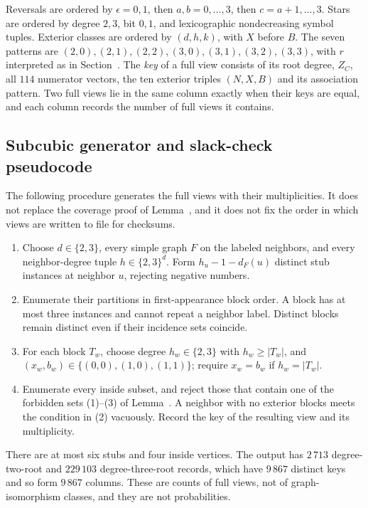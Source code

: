 \documentclass[11pt]{article}
\begin{document}
Reversals are ordered by $\epsilon=0,1$, then $a,b=0,\ldots,3$, then $c=a+1,\ldots,3$. Stars are ordered by degree $2,3$, bit $0,1$, and lexicographic nondecreasing symbol tuples. Exterior classes are ordered by $(d,h,k)$, with $X$ before $B$. The seven patterns are $(2,0),(2,1),(2,2),(3,0),(3,1),(3,2),(3,3)$, with $r$ interpreted as in Section~. The \emph{key} of a full view consists of its root degree, $Z_C$, all $114$ numerator vectors, the ten exterior triples $(N,X,B)$ and its association pattern. Two full views lie in the same column exactly when their keys are equal, and each column records the number of full views it contains.

\subsection{Subcubic generator and slack-check pseudocode}
The following procedure generates the full views with their multiplicities. It does not replace the coverage proof of Lemma~, and it does not fix the order in which views are written to file for checksums.
\begin{enumerate}[itemsep=3pt]
\item Choose $d\in\{2,3\}$, every simple graph $F$ on the labeled neighbors, and every neighbor-degree tuple $h\in\{2,3\}^d$. Form $h_u-1-d_F(u)$ distinct stub instances at neighbor $u$, rejecting negative numbers.
\item Enumerate their partitions in first-appearance block order. A block has at most three instances and cannot repeat a neighbor label. Distinct blocks remain distinct even if their incidence sets coincide.
\item For each block $T_w$, choose degree $h_w\in\{2,3\}$ with $h_w\ge|T_w|$, and $(x_w,b_w)\in\{(0,0),(1,0),(1,1)\}$; require $x_w=b_w$ if $h_w=|T_w|$.
\item Enumerate every inside subset, and reject those that contain one of the forbidden sets (1)--(3) of Lemma~. A neighbor with no exterior blocks meets the condition in (2) vacuously. Record the key of the resulting view and its multiplicity.
\end{enumerate}
There are at most six stubs and four inside vertices. The output has $2\,713$ degree-two-root and $229\,103$ degree-three-root records, which have $9\,867$ distinct keys and so form $9\,867$ columns. These are counts of full views, not of graph-isomorphism classes, and they are not probabilities.
\end{document}
